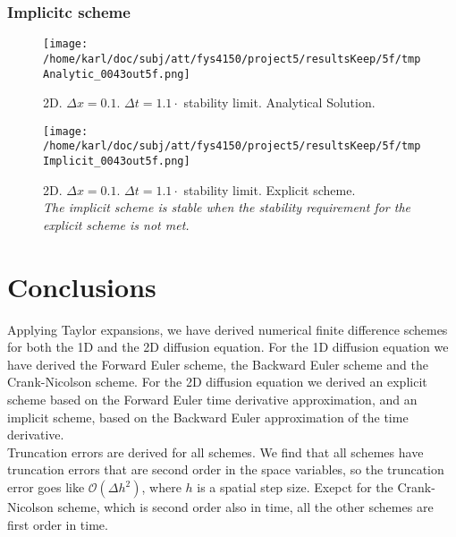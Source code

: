 \documentclass{article}
\begin{document}
\subsubsection{Implicitc scheme}
\begin{minipage}{.45\textwidth} 
	\begin{figure}[H]
		\centering
		\texttt{[image: /home/karl/doc/subj/att/fys4150/project5/resultsKeep/5f/tmpAnalytic\_0043out5f.png]}
		\caption{2D. $\Delta x = 0.1$. $\Delta t = 1.1 \cdot$ stability limit.  Analytical Solution.\\ \textit{}}
		\label{fig:fig2d8}
	\end{figure}
\end{minipage}\hfill
\begin{minipage}{.45\textwidth} 
	\begin{figure}[H]
		\centering
		\texttt{[image: /home/karl/doc/subj/att/fys4150/project5/resultsKeep/5f/tmpImplicit\_0043out5f.png]}
		\caption{2D. $\Delta x = 0.1$. $\Delta t = 1.1 \cdot$ stability limit.  Explicit scheme.\\ \textit{The implicit scheme is stable when the stability requirement for the explicit scheme is not met.}}
		\label{fig:fig2d9}
	\end{figure}
\end{minipage}\hfill
\vspace{2ex}

\section{Conclusions}
Applying Taylor expansions, we have derived numerical finite difference schemes for both the 1D and the 2D diffusion equation. For the 1D diffusion equation we have derived the Forward Euler scheme, the Backward Euler scheme and the Crank-Nicolson scheme. For the 2D diffusion equation we derived an explicit scheme based on the Forward Euler time derivative approximation, and an implicit scheme, based on the Backward Euler approximation of the time derivative.\\

Truncation errors are derived for all schemes. We find that all schemes have truncation errors that are second order in the space variables, so the truncation error goes like $\mathcal{O}(\Delta h^2)$, where $h$ is a spatial step size. Exepct for the Crank-Nicolson scheme, which is second order also in time, all the other schemes are first order in time.\\
\end{document}
